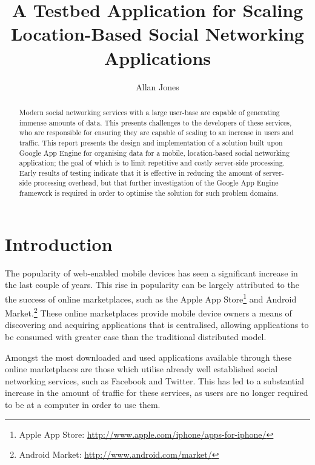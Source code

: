 \documentclass{article}
\title{A Testbed Application for Scaling Location-Based Social Networking Applications}
\author{Allan Jones}
\begin{document}
	\maketitle

\begin{abstract}
	Modern social networking services with a large user-base are capable of generating immense amounts of data. This presents challenges to the developers of these services, who are responsible for ensuring they are capable of scaling to an increase in users and traffic. This report presents the design and implementation of a solution built upon Google App Engine for organising data for a mobile, location-based social networking application; the goal of which is to limit repetitive and costly server-side processing. Early results of testing indicate that it is effective in reducing the amount of server-side processing overhead, but that further investigation of the Google App Engine framework is required in order to optimise the solution for such problem domains.
\end{abstract}

\section{Introduction} %
\label{sec:introduction}


The popularity of web-enabled mobile devices has seen a significant increase in the last couple of years. This rise in popularity can be largely attributed to the the success of online marketplaces, such as the Apple App Store\footnote{Apple App Store: \url{http://www.apple.com/iphone/apps-for-iphone/}} and Android Market.\footnote{Android Market: \url{http://www.android.com/market/}} These online marketplaces provide mobile device owners a means of discovering and acquiring applications that is centralised, allowing applications to be consumed with greater ease than the traditional distributed model.

Amongst the most downloaded and used applications available through these online marketplaces are those which utilise already well established social networking services, such as Facebook and Twitter. This has led to a substantial increase in the amount of traffic for these services, as users are no longer required to be at a computer in order to use them.
\end{document}
